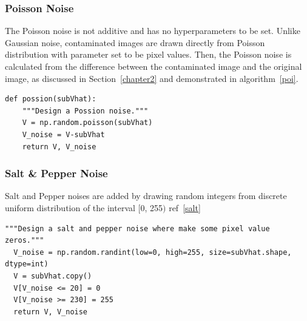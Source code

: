 \subsubsection{Poisson Noise}
The Poisson noise is not additive and has no hyperparameters to be set. Unlike Gaussian noise, contaminated images are drawn directly from Poisson distribution with parameter set to be pixel values. Then, the Poisson noise is calculated from the difference between the contaminated image and the original image, as discussed in Section~\ref{chapter2} and demonstrated in algorithm~\ref{poi}.
\begin{lstlisting}[caption= Poisson Noise Design, label=poi]
def possion(subVhat):
    """Design a Possion noise."""
    V = np.random.poisson(subVhat)
    V_noise = V-subVhat
    return V, V_noise
\end{lstlisting}


\subsubsection{Salt \& Pepper Noise}
Salt and Pepper noises are added by drawing random integers from discrete uniform distribution of the interval $[$0, 255$)$  ref~\ref{salt}
\begin{lstlisting}[caption= Salt and Pepper Noise Design, label=salt]
"""Design a salt and pepper noise where make some pixel value zeros."""
  V_noise = np.random.randint(low=0, high=255, size=subVhat.shape, dtype=int)
  V = subVhat.copy()
  V[V_noise <= 20] = 0
  V[V_noise >= 230] = 255
  return V, V_noise
\end{lstlisting}

